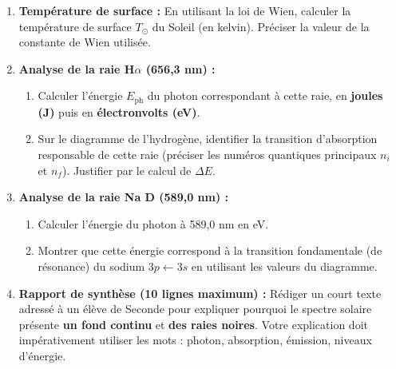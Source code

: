 \documentclass[11pt]{article}
\newcommand{\cle}[1]{{\popxbold\color{popdark}#1}}
\begin{document}
\begin{enumerate}
    \item \textbf{Température de surface :} En utilisant la \cle{loi de Wien}, calculer la température de surface $T_{\odot}$ du Soleil (en kelvin). Préciser la valeur de la constante de Wien utilisée.
    \item \textbf{Analyse de la raie H$\alpha$ (656,3 nm) :}
    \begin{enumerate}
        \item Calculer l'énergie $E_{\text{ph}}$ du photon correspondant à cette raie, en \textbf{joules (J)} puis en \textbf{électronvolts (eV)}.
        \item Sur le diagramme de l'hydrogène, identifier la transition d'absorption responsable de cette raie (préciser les numéros quantiques principaux $n_i$ et $n_f$). Justifier par le calcul de $\Delta E$.
    \end{enumerate}
    \item \textbf{Analyse de la raie Na D (589,0 nm) :}
    \begin{enumerate}
        \item Calculer l'énergie du photon à 589,0 nm en eV.
        \item Montrer que cette énergie correspond à la transition fondamentale (de résonance) du sodium $3p \leftarrow 3s$ en utilisant les valeurs du diagramme.
    \end{enumerate}
    \item \textbf{Rapport de synthèse (10 lignes maximum) :} Rédiger un court texte adressé à un élève de Seconde pour expliquer pourquoi le spectre solaire présente \textbf{un fond continu} et \textbf{des raies noires}. Votre explication doit impérativement utiliser les mots : \cle{photon}, \cle{absorption}, \cle{émission}, \cle{niveaux d'énergie}.
\end{enumerate}
\end{document}
